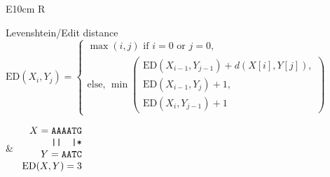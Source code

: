 \begin{table}
\begin{tabularx}{\textwidth}{E{10cm}   R}
        \begin{minipage}{10cm}
            Levenshtein/Edit distance \\
            $ \mathrm{ED}(X_i,Y_j)= \left\{
                \begin{array}{l}
                    \max(i,j) \mbox{ if } i=0 \mbox{ or } j=0 {,} \\
                    \mbox{else, } \min 
                    \begin{pmatrix}
                        \mathrm{ED}(X_{i-1},Y_{j-1})+d(X[i],Y[j]), \\
                        \mathrm{ED}(X_{i-1},Y_j)+1, \\
                        \mathrm{ED}(X_i,Y_{j-1})+1
                    \end{pmatrix} 
                \end{array} \right. $
            \end{minipage}
            &
            $\begin{array}{r}
                X= \mathrm{\texttt{AAAATG}}\\
                   \mathrm{\texttt{||~~|*}}\\
                Y= \mathrm{\texttt{AA\-\-TC}}\\
                \mathrm{ED}(X,Y)=3
            \end{array}$\\
    \end{tabularx}
    \caption{Example for various similarities, in bold those we study in this thesis.}
    \label{fig:intro:similarities}
\end{table}
\renewcommand{\arraystretch}{1}